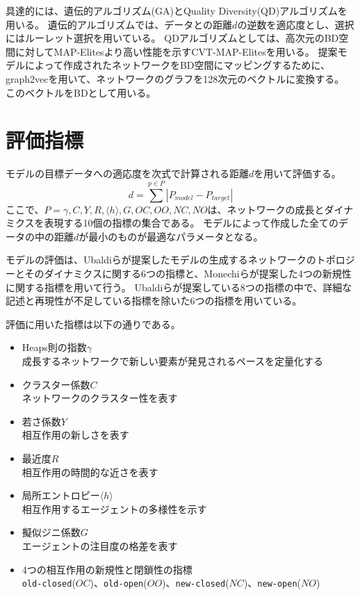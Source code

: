 \documentclass[uplatex,11pt,openany]{ujreport}
\begin{document}
        具達的には、遺伝的アルゴリズム(GA)とQuality Diversity(QD)アルゴリズムを用いる。
        遺伝的アルゴリズムでは、データとの距離$d$の逆数を適応度とし、選択にはルーレット選択を用いている。
        QDアルゴリズムとしては、高次元のBD空間に対してMAP-Elitesより高い性能を示すCVT-MAP-Elitesを用いる。
        提案モデルによって作成されたネットワークをBD空間にマッピングするために、graph2vecを用いて、ネットワークのグラフを128次元のベクトルに変換する。
        このベクトルをBDとして用いる。


    \section{評価指標}
        モデルの目標データへの適応度を次式で計算される距離$d$を用いて評価する。
        \begin{equation}
            d = \sum^{p\in P}|P_{model}-P_{target}|
        \end{equation}
        ここで、$P={\gamma,C,Y,R, \langle h\rangle ,G,OC,OO,NC,NO}$は、ネットワークの成長とダイナミクスを表現する10個の指標の集合である。
        モデルによって作成した全てのデータの中の距離$d$が最小のものが最適なパラメータとなる。

        モデルの評価は、Ubaldiらが提案したモデルの生成するネットワークのトポロジーとそのダイナミクスに関する6つの指標\cite{ubaldi_emergence_2021}と、Monechiらが提案した4つの新規性に関する指標\cite{monechi_waves_2017}を用いて行う。
        Ubaldiらが提案している8つの指標の中で、詳細な記述と再現性が不足している指標を除いた6つの指標を用いている。

        評価に用いた指標は以下の通りである。
        \begin{itemize}
            \item Heaps則の指数$\gamma$\\成長するネットワークで新しい要素が発見されるペースを定量化する
            \item クラスター係数$C$\\ネットワークのクラスター性を表す
            \item 若さ係数$Y$\\相互作用の新しさを表す
            \item 最近度$R$\\相互作用の時間的な近さを表す
            \item 局所エントロピー$\langle h\rangle$\\相互作用するエージェントの多様性を示す
            \item 擬似ジニ係数$G$\\エージェントの注目度の格差を表す
            \item 4つの相互作用の新規性と閉鎖性の指標\\\verb|old-closed|($OC$)、\verb|old-open|($OO$)、\verb|new-closed|($NC$)、\verb|new-open|($NO$)
        \end{itemize}
\end{document}
